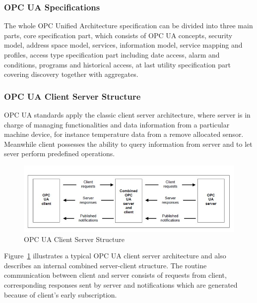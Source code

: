 \documentclass[]{llncs}
\begin{document}
\subsubsection{OPC UA Specifications}

The whole OPC Unified Architecture specification can be divided into three main parts, core specification part, which consists of OPC UA concepts, security model, address space model, services, information model, service mapping and profiles, access type specification part including date access, alarm and conditions, programs and historical access, at last utility specification part covering discovery together with aggregates.

\subsubsection{OPC UA Client Server Structure}
 OPC UA standards apply the classic client server architecture, where server is in charge of managing functionalities and data information from a particular machine device, for instance temperature data from a remove allocated sensor. Meanwhile client possesses the ability to query information from server and to let sever perform predefined operations.

\begin{figure}[!htbp]
	\centering
	\includegraphics[width=1.00\textwidth]{cs.jpg}
		\caption[ ]{OPC UA Client Server Structure\cite{O1}}
	\label{fig:cs}
\end{figure}
Figure~\ref{fig:cs} illustrates a typical OPC UA client server architecture and also describes an internal combined server-client structure. The routine communication between client and server consists of requests from client, corresponding responses sent by server and notifications which are generated because of client's early subscription.
\end{document}
